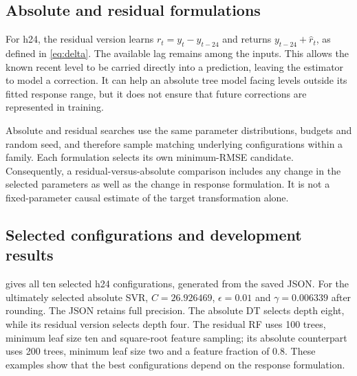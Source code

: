 \subsection{Absolute and residual formulations}
For h24, the residual version learns $r_t=y_t-y_{t-24}$ and returns $y_{t-24}+\widehat r_t$, as defined in \cref{eq:delta}. The available lag remains among the inputs. This allows the known recent level to be carried directly into a prediction, leaving the estimator to model a correction. It can help an absolute tree model facing levels outside its fitted response range, but it does not ensure that future corrections are represented in training.

Absolute and residual searches use the same parameter distributions, budgets and random seed, and therefore sample matching underlying configurations within a family. Each formulation selects its own minimum-RMSE candidate. Consequently, a residual-versus-absolute comparison includes any change in the selected parameters as well as the change in response formulation. It is not a fixed-parameter causal estimate of the target transformation alone.

\subsection{Selected configurations and development results}
 gives all ten selected h24 configurations, generated from the saved JSON. For the ultimately selected absolute SVR, $C=\num{26.926469}$, $\epsilon=\num{0.01}$ and $\gamma=\num{0.006339}$ after rounding. The JSON retains full precision. The absolute DT selects depth eight, while its residual version selects depth four. The residual RF uses 100 trees, minimum leaf size ten and square-root feature sampling; its absolute counterpart uses 200 trees, minimum leaf size two and a feature fraction of 0.8. These examples show that the best configurations depend on the response formulation.


